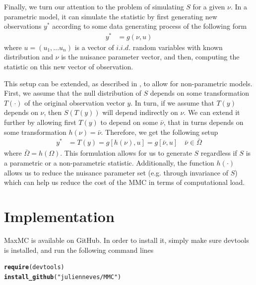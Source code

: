 \documentclass[]{article}\usepackage[]{graphicx}\usepackage[]{color}
\makeatletter
\newcommand{\hlstr}[1]{\textcolor[rgb]{0.192,0.494,0.8}{#1}}%
\newcommand{\hlstd}[1]{\textcolor[rgb]{0.345,0.345,0.345}{#1}}%
\newcommand{\hlkwd}[1]{\textcolor[rgb]{0.737,0.353,0.396}{\textbf{#1}}}%
\newenvironment{kframe}{%
 \def\at@end@of@kframe{}%
 \ifinner\ifhmode%
  \def\at@end@of@kframe{\end{minipage}}%
  \begin{minipage}{\columnwidth}%
 \fi\fi%
 \def\FrameCommand##1{\hskip\@totalleftmargin \hskip-\fboxsep
 \colorbox{shadecolor}{##1}\hskip-\fboxsep
     \hskip-\linewidth \hskip-\@totalleftmargin \hskip\columnwidth}%
 \MakeFramed {\advance\hsize-\width
   \@totalleftmargin\z@ \linewidth\hsize
   \@setminipage}}%
 {\par\unskip\endMakeFramed%
 \at@end@of@kframe}
\newenvironment{knitrout}{}{} %
\newcommand{\pkg}[1]{{\normalfont\fontseries{b}\selectfont #1}}
\makeatother
\begin{document}
Finally, we turn our attention to the problem of simulating $S$ for a given $\nu$. In a parametric model, it can simulate the statistic by first generating new observations $y^*$ according to some data generating process of the following form
\begin{align}
	y^* & = g(\nu,u)
\end{align}
where $u=(u_1,...u_n)$ is a vector of $i.i.d.$ random variables with known distribution and $\nu$ is the nuisance parameter vector, and then, computing the statistic on this new vector of observation.

 This setup can be extended, as described in \cite{dufour_monte_2006}, to allow for non-parametric models. First, we assume that the null distribution of $S$ depends on some transformation $T(\cdot)$ of the original observation vector $y$. In turn, if we assume that $T(y)$ depends on $\nu$, then $S(T(y))$ will depend indirectly on $\nu$. We can extend it further by allowing first $T(y)$ to depend on some $\bar{\nu}$, that in turns depends on some transformation $h(\nu)=\bar{\nu}$. Therefore, we get the following setup
 \begin{align}
 	y^* & = T(y) = g[h(\nu), u] = g[\bar{\nu},u] \quad \bar{\nu} \in \bar{\Omega}
 \end{align}
 where $\bar{\Omega}=h(\Omega)$. This formulation allows for us to generate $S$ regardless if $S$ is a parametric or a non-parametric statistic. Additionally, the function $h(\cdot)$ allows us to reduce the nuisance parameter set (e.g. through invariance of $S$) which can help us reduce the cost of the MMC in terms of computational load.




\section{Implementation}

\pkg{MaxMC} is available on GitHub. In order to install it, simply make sure \pkg{devtools} \citep{wickham_devtools:_2016} is installed, and run the following command lines
\begin{knitrout}
\color{fgcolor}\begin{kframe}
\begin{alltt}
\hlkwd{require}\hlstd{(devtools)}
\hlkwd{install_github}\hlstd{(}\hlstr{"julienneves/MMC"}\hlstd{)}
\end{alltt}
\end{kframe}
\end{knitrout}
\end{document}
